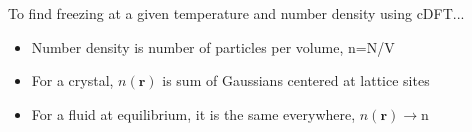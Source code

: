 \documentclass{beamer}
\renewcommand{\vec}[1]{\mathbf{#1}}
\begin{document}
\begin{frame}{To find freezing at a given temperature and number density using cDFT...}
\begin{block}{}
\begin{itemize}
          \item Number density is number of particles per volume, n=N/V
          \item For a crystal, $n(\vec r)$ is sum of Gaussians centered at lattice sites
          \item For a fluid at equilibrium, it is the same everywhere, $n(\vec r)\rightarrow \text{n}$
       \end{itemize}
\end{block}
\end{frame}
\end{document}
